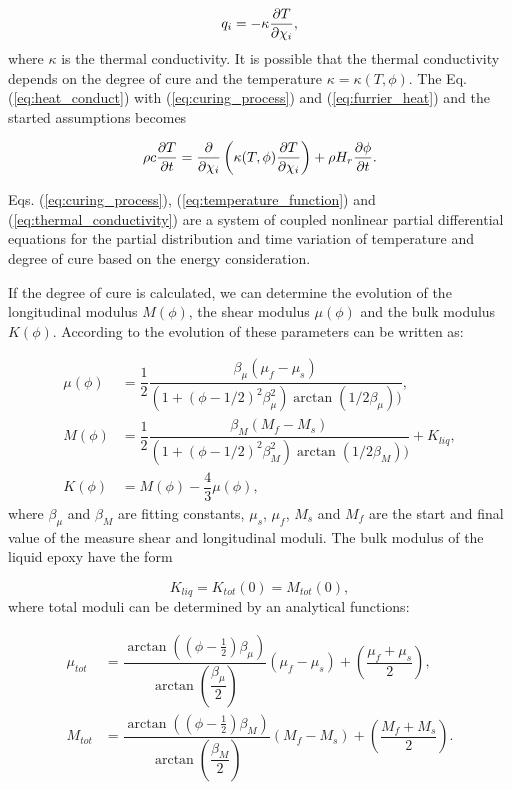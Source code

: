 \begin{equation}\label{eq:furrier_heat}
	q_i = - \kappa \pdv{T}{\chi_i},
\end{equation}
where $\kappa$ is the thermal conductivity. It is possible that the thermal conductivity depends on the degree of cure and the temperature $\kappa = \kappa(T, \phi)$. The Eq. (\ref{eq:heat_conduct}) with (\ref{eq:curing_process}) and (\ref{eq:furrier_heat}) and the started assumptions becomes

\begin{equation}\label{eq:thermal_conductivity}
	\rho c \pdv{T}{t} = \pdv{\chi_i} \left( \kappa(T, \phi)  \pdv{T}{\chi_i} \right) + \rho H_r \pdv{\phi}{t}.
\end{equation}
 
 Eqs. (\ref{eq:curing_process}), (\ref{eq:temperature_function}) and (\ref{eq:thermal_conductivity}) are a system of coupled nonlinear partial differential equations for the partial distribution and time variation of temperature and degree of cure based on the energy consideration. 
 
 If the degree of cure is calculated, we can determine the evolution of the longitudinal modulus $M(\phi)$, the shear modulus $\mu(\phi)$ and the bulk modulus $K(\phi)$. According to \cite{heinrich2012generation} the evolution of these parameters can be written as:
 
 \begin{align}
 	\mu(\phi) &= \dfrac{1}{2} \dfrac{\beta_\mu ( \mu_f - \mu_s)}{\left(1+(\phi-1/2)^2 \beta_\mu^2\right) \arctan(1/2\beta_\mu))}, \\
 	M(\phi) &= \dfrac{1}{2} \dfrac{\beta_M ( M_f - M_s)}{\left(1+(\phi-1/2)^2 \beta_M^2\right) \arctan(1/2\beta_M))} + K_{liq}, \\
 	K(\phi) &= M(\phi) - \dfrac{4}{3}\mu(\phi),
 \end{align}
 where $\beta_\mu$ and $\beta_M$ are fitting constants, $\mu_s$, $\mu_f$, $M_s$ and $M_f$ are the start and final value of the measure shear and longitudinal moduli. The bulk modulus of the liquid epoxy have the form
 
 \begin{equation}
 	K_{liq} = K_{tot}(0) = M_{tot}(0),
 \end{equation} 
 where total moduli can be determined by an analytical functions:
 
 \begin{align}
 	\mu_{tot} &= \dfrac{\arctan((\phi-\frac{1}{2})\beta_\mu)}{\arctan(\dfrac{\beta_\mu}{2})}(\mu_f-\mu_s)+\left( \dfrac{\mu_f + \mu_s}{2} \right),\\
 	M_{tot} &= \dfrac{\arctan((\phi-\frac{1}{2})\beta_M)}{\arctan(\dfrac{\beta_M}{2})}(M_f-M_s)+\left( \dfrac{M_f + M_s}{2} \right).
 \end{align}
 
